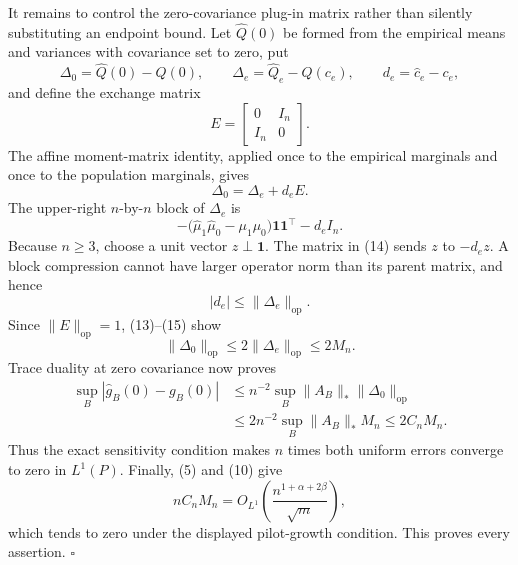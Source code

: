 It remains to control the zero-covariance plug-in matrix rather than silently substituting an endpoint bound.  Let \(\widehat Q(0)\) be formed from the empirical means and variances with covariance set to zero, put
\[
\Delta_0=\widehat Q(0)-Q(0),
\qquad
\Delta_e=\widehat Q_e-Q(c_e),
\qquad
d_e=\widehat c_e-c_e,
\]
and define the exchange matrix
\[
E=\begin{bmatrix}0&I_n\\I_n&0\end{bmatrix}.
\]
The affine moment-matrix identity, applied once to the empirical marginals and once to the population marginals, gives
\[
\Delta_0=\Delta_e+d_eE.
\tag{13}
\]
The upper-right \(n\)-by-\(n\) block of \(\Delta_e\) is
\[
-\bigl(\widehat\mu_1\widehat\mu_0-\mu_1\mu_0\bigr)
\mathbf1\mathbf1^{\top}-d_eI_n.
\tag{14}
\]
Because \(n\ge3\), choose a unit vector \(z\perp\mathbf1\).  The matrix in (14) sends \(z\) to \(-d_ez\).  A block compression cannot have larger operator norm than its parent matrix, and hence
\[
|d_e|\le\lVert\Delta_e\rVert_{\mathrm{op}}.
\tag{15}
\]
Since \(\lVert E\rVert_{\mathrm{op}}=1\), (13)--(15) show
\[
\lVert\Delta_0\rVert_{\mathrm{op}}
\le2\lVert\Delta_e\rVert_{\mathrm{op}}
\le2M_n.
\tag{16}
\]
Trace duality at zero covariance now proves
\[
\begin{aligned}
\sup_B|\widehat g_B(0)-g_B(0)|
&\le n^{-2}\sup_B\lVert A_B\rVert_*
\lVert\Delta_0\rVert_{\mathrm{op}}\\
&\le2n^{-2}\sup_B\lVert A_B\rVert_*M_n
\le2C_nM_n.
\end{aligned}
\tag{17}
\]
Thus the exact sensitivity condition makes \(n\) times both uniform errors converge to zero in \(L^1(P)\).  Finally, (5) and (10) give
\[
nC_nM_n
=O_{L^1}\!\left(
\frac{n^{1+\alpha+2\beta}}{\sqrt m}
\right),
\]
which tends to zero under the displayed pilot-growth condition.  This proves every assertion. \(\square\)